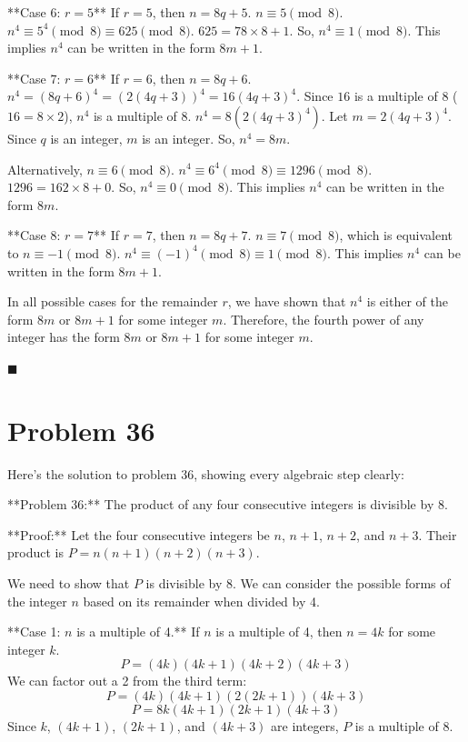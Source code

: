 \documentclass{article}
\begin{document}
**Case 6: $r = 5$**
If $r = 5$, then $n = 8q + 5$.
$n \equiv 5 \pmod{8}$.
$n^4 \equiv 5^4 \pmod{8} \equiv 625 \pmod{8}$.
$625 = 78 \times 8 + 1$.
So, $n^4 \equiv 1 \pmod{8}$.
This implies $n^4$ can be written in the form $8m + 1$.

\add [10pt]

**Case 7: $r = 6$**
If $r = 6$, then $n = 8q + 6$.
$n^4 = (8q + 6)^4 = (2(4q + 3))^4 = 16(4q + 3)^4$.
Since $16$ is a multiple of $8$ ($16 = 8 \times 2$), $n^4$ is a multiple of $8$.
$n^4 = 8(2(4q + 3)^4)$. Let $m = 2(4q + 3)^4$. Since $q$ is an integer, $m$ is an integer.
So, $n^4 = 8m$.

Alternatively, $n \equiv 6 \pmod{8}$.
$n^4 \equiv 6^4 \pmod{8} \equiv 1296 \pmod{8}$.
$1296 = 162 \times 8 + 0$.
So, $n^4 \equiv 0 \pmod{8}$.
This implies $n^4$ can be written in the form $8m$.

\add [10pt]

**Case 8: $r = 7$**
If $r = 7$, then $n = 8q + 7$.
$n \equiv 7 \pmod{8}$, which is equivalent to $n \equiv -1 \pmod{8}$.
$n^4 \equiv (-1)^4 \pmod{8} \equiv 1 \pmod{8}$.
This implies $n^4$ can be written in the form $8m + 1$.

\add [10pt]

In all possible cases for the remainder $r$, we have shown that $n^4$ is either of the form $8m$ or $8m + 1$ for some integer $m$. Therefore, the fourth power of any integer has the form $8m$ or $8m + 1$ for some integer $m$.

$\blacksquare$

\newpage

\section*{Problem 36}
Here's the solution to problem 36, showing every algebraic step clearly:

**Problem 36:** The product of any four consecutive integers is divisible by 8.

**Proof:**
Let the four consecutive integers be $n$, $n+1$, $n+2$, and $n+3$. Their product is $P = n(n+1)(n+2)(n+3)$.

We need to show that $P$ is divisible by 8. We can consider the possible forms of the integer $n$ based on its remainder when divided by 4.

**Case 1: $n$ is a multiple of 4.**
If $n$ is a multiple of 4, then $n = 4k$ for some integer $k$.
$$
P = (4k)(4k+1)(4k+2)(4k+3)
$$
We can factor out a 2 from the third term:
$$
P = (4k)(4k+1)(2(2k+1))(4k+3)
$$
$$
P = 8k(4k+1)(2k+1)(4k+3)
$$
Since $k$, $(4k+1)$, $(2k+1)$, and $(4k+3)$ are integers, $P$ is a multiple of 8.
\end{document}
